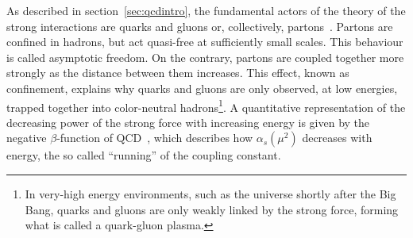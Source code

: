As described in section~\ref{sec:qcdintro}, the fundamental actors of the theory of the strong interactions are quarks and gluons or, collectively, partons~\cite{PhysRevLett.23.1415}. Partons are confined in  %
hadrons, but act quasi-free at sufficiently small scales. This behaviour is called asymptotic freedom. On the contrary, partons are coupled together more strongly as the distance between them increases. This effect, known as confinement, explains why quarks and gluons are only observed, at low energies, trapped together into color-neutral hadrons\footnote{In very-high energy environments, such as the universe shortly after the Big Bang, quarks and gluons are only weakly linked by the strong force, forming what is called a quark-gluon plasma.}.  A quantitative representation of the decreasing power of the strong force with increasing energy is given by the negative $\beta$-function of QCD~\cite{PhysRevLett.30.1346,PhysRevLett.30.1343}, 
which describes how $\alpha_s(\mu^2)$ decreases with energy, the so called ``running'' of the coupling constant.

